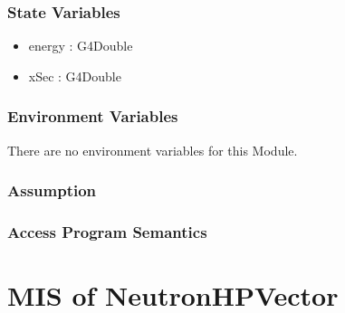 \documentclass[12pt]{article}
\begin{document}
\subsubsection{State Variables}%
\begin{itemize}
\item energy : G4Double
\item xSec : G4Double
\end{itemize}

\subsubsection{Environment Variables}%
There are no environment variables for this Module.

\subsubsection{Assumption}%

\subsubsection{Access Program Semantics}%


\section{MIS of NeutronHPVector}
\end{document}
